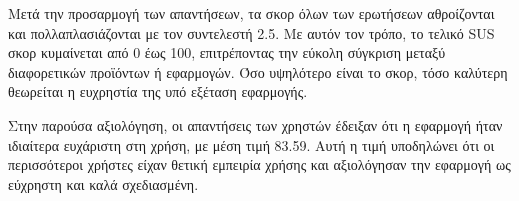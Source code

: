         Μετά την προσαρμογή των απαντήσεων, τα σκορ όλων των ερωτήσεων αθροίζονται και πολλαπλασιάζονται με τον συντελεστή 2.5. Με αυτόν τον τρόπο, το τελικό SUS σκορ κυμαίνεται από 0 έως 100, επιτρέποντας την εύκολη σύγκριση μεταξύ διαφορετικών προϊόντων ή εφαρμογών. Όσο υψηλότερο είναι το σκορ, τόσο καλύτερη θεωρείται η ευχρηστία της υπό εξέταση εφαρμογής.

        Στην παρούσα αξιολόγηση, οι απαντήσεις των χρηστών έδειξαν ότι η εφαρμογή ήταν ιδιαίτερα ευχάριστη στη χρήση, με μέση τιμή 83.59. Αυτή η τιμή υποδηλώνει ότι οι περισσότεροι χρήστες είχαν θετική εμπειρία χρήσης και αξιολόγησαν την εφαρμογή ως εύχρηστη και καλά σχεδιασμένη.
